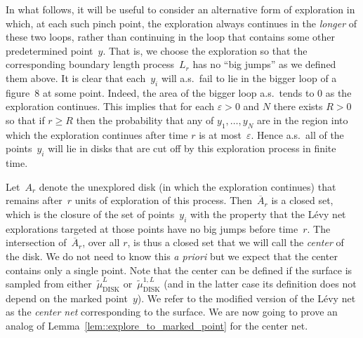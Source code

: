 \documentclass[10pt]{amsart}
\let\epsilon\varepsilon
\theoremstyle{plain}
\numberwithin{theorem}{section}
\theoremstyle{definition}
\newcommand{\tmudonel}{\wt{\mu}_{ \mathrm{DISK}}^{1, L}}
\newcommand{\tmudl}{\wt{\mu}_{\mathrm{DISK}}^L}
\let\ol\overline
\let\wt\widetilde
\begin{document}
In what follows, it will be useful to consider an alternative form of exploration in which, at each such pinch point, the exploration always continues in the \emph{longer} of these two loops, rather than continuing in the loop that contains some other predetermined point~$y$. That is, we choose the exploration so that the corresponding boundary length process~$L_r$ has no ``big jumps'' as we defined them above. It is clear that each~$y_i$ will a.s.\ fail to lie in the bigger loop of a figure~$8$ at some point. Indeed, the area of the bigger loop a.s.\ tends to $0$ as the exploration continues. This implies that for each $\epsilon > 0$ and $N$ there exists $R > 0$ so that if $r \geq R$ then the probability that any of $y_1,\ldots,y_N$ are in the region into which the exploration continues after time $r$ is at most~$\epsilon$. Hence a.s.\ all of the points~$y_i$ will lie in disks that are cut off by this exploration process in finite time.

Let~$A_r$ denote the unexplored disk (in which the exploration continues) that remains after~$r$ units of exploration of this process. Then~$\ol{A}_r$ is a closed set, which is the closure of the set of points~$y_i$ with the property that the Lévy net explorations targeted at those points have no big jumps before time~$r$. The intersection of~$\ol{A}_r$, over all $r$, is thus a closed set that we will call the \emph{center} of the disk. We do not need to know this \emph{a priori} but we expect that the center contains only a single point. Note that the center can be defined if the surface is sampled from either~$\tmudl$ or~$\tmudonel$ (and in the latter case its definition does not depend on the marked point~$y$). We refer to the modified version of the Lévy net as the \emph{center net} corresponding to the surface. We are now going to prove an analog of Lemma~\ref{lem::explore_to_marked_point} for the center net.
\end{document}
